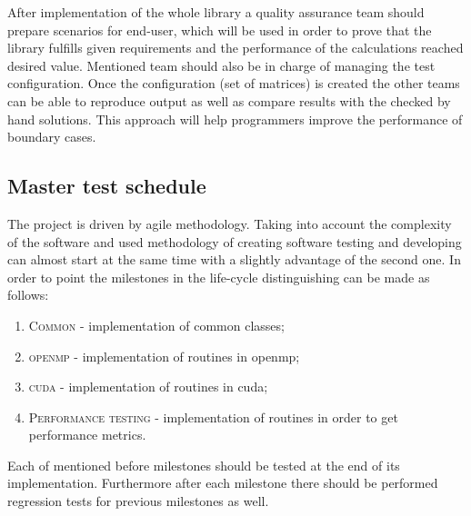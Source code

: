 	After implementation of the whole library a quality assurance team should prepare scenarios for end-user, which will be used in order to prove that the library fulfills given requirements and the performance of the calculations reached desired value. Mentioned team should also be in charge of managing the test configuration. Once the configuration (set of matrices) is created the other teams can be able to reproduce output as well as compare results with the checked by hand solutions. This approach will help programmers improve the performance of boundary cases. 
\subsection{Master test schedule} \label{s:introduction:master-test-schedule}
	\begin{comment}
		$<$Describe the test activities within the project life cycle and milestones. Summarize the overall schedule of the testing tasks, identifying where task results feed back to the development, organizational, and supporting processes (e.g., quality assurance and configuration management). Describe the task iteration policy for the re-execution of test tasks and any dependencies. $>$
	\end{comment}
	The project is driven by agile methodology. Taking into account the complexity of the software and used methodology of creating software testing and developing can almost start at the same time with a slightly advantage of the second one. In order to point the milestones in the life-cycle distinguishing can be made as follows:
	\begin{enumerate}
		\item \textsc{Common} - implementation of common classes;
		\item \textsc{\gls{openmp}} - implementation of routines in \gls{openmp};
		\item \textsc{\gls{cuda}} - implementation of routines in \gls{cuda};
		\item \textsc{Performance testing} - implementation of routines in order to get performance metrics.
	\end{enumerate}
	Each of mentioned before milestones should be tested at the end of its implementation. Furthermore after each milestone there should be performed regression tests for previous milestones as well. 
